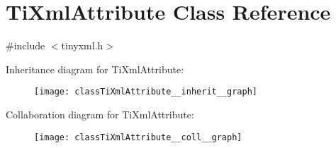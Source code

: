 \hypertarget{classTiXmlAttribute}{}\section{Ti\+Xml\+Attribute Class Reference}
\label{classTiXmlAttribute}


{\ttfamily \#include $<$tinyxml.\+h$>$}



Inheritance diagram for Ti\+Xml\+Attribute\+:\nopagebreak
\begin{figure}[H]
\begin{center}
\leavevmode
\texttt{[image: classTiXmlAttribute\_\_inherit\_\_graph]}
\end{center}
\end{figure}


Collaboration diagram for Ti\+Xml\+Attribute\+:\nopagebreak
\begin{figure}[H]
\begin{center}
\leavevmode
\texttt{[image: classTiXmlAttribute\_\_coll\_\_graph]}
\end{center}
\end{figure}
